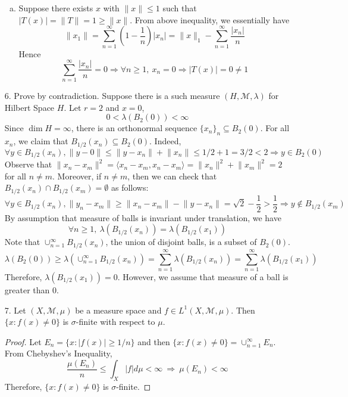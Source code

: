 \begin{itemize}
\begin{enumerate}[(a)]
			\item Suppose there exists $x$ with $\lVert x\rVert \le 1$ such that $|T(x)| = \lVert T\rVert = 1 \ge \lVert x\rVert$. From above inequality, we essentially have
			$$
			\lVert x_1\rVert = \sum_{n=1}^\infty \left(1-\frac{1}{n}\right) \left\lvert  x_n  \right\rvert = \lVert x\rVert_1 - \sum_{n=1}^\infty \frac{|x_n|}{n}
			$$
			Hence
			$$
			\sum_{n=1}^\infty \frac{|x_n|}{n} = 0 \Rightarrow  \forall n\ge 1,~ x_n=0 \Rightarrow |T(x)| = 0 \neq 1
			$$
		\end{enumerate}
		
		\item[6.] Prove by contradiction. Suppose there is a such measure $(H, \mathcal{M}, \lambda)$ for Hilbert Space $H$. Let $r=2$ and $x=0$, 
		$$
		0<\lambda\left(B_2(0)\right)<\infty
		$$
		Since $\dim H =\infty$, there is an orthonormal sequence $\{x_n\}_n\subseteq B_2(0)$. For all $x_n$, we claim that $B_{1/2}(x_n)\subseteq B_2(0)$. Indeed,
		$$
		\forall y\in B_{1/2}(x_n), \lVert y-0\rVert \le  \lVert y-x_n\rVert + \lVert x_n\rVert \le 1/2 + 1 = 3/2 < 2 \Rightarrow y\in B_2(0)
		$$
		Observe that $\lVert x_n - x_m \rVert ^2 = \langle x_n-x_m, x_n-x_m\rangle = \lVert x_n\rVert^2 + \lVert x_m\rVert^2 = 2$ for all $n\neq m$. Moreover, if $n\neq m$, then we can check that $B_{1/2}(x_n) \cap B_{1/2}(x_m) = \emptyset$ as follows:
		$$
		\forall y\in B_{1/2}(x_n), \lVert y_n - x_m \rVert \ge \lVert x_n -x_m \rVert - \lVert y-x_n\rVert = \sqrt{2} - \frac{1}{2}  > \frac{1}{2} \Rightarrow y\not \in B_{1/2}(x_m) 
		$$
		By assumption that measure of balls is invariant under translation, we have 
		$$\forall n\ge 1, ~\lambda(B_{1/2}(x_n)) = \lambda(B_{1/2}(x_1))$$
		Note that $\cup_{n=1}^\infty B_{1/2}(x_n)$, the union of disjoint balls, is a subset of $B_2(0)$. 
		$$
		\lambda(B_2(0)) \ge \lambda\left( \cup_{n=1}^\infty B_{1/2}(x_n)\right) =\sum_{n=1}^\infty \lambda(B_{1/2}(x_n)) = \sum_{n=1}^\infty \lambda(B_{1/2}(x_1))
		$$
		Therefore, $\lambda(B_{1/2}(x_1)) = 0$. However, we assume that measure of a ball is greater than 0.
		
		\item[7.] Let $(X,\mathcal{M}, \mu)$ be a measure space and $f \in L^1(X,\mathcal{M}, \mu)$. Then $\{x : f(x) \neq 0\}$ is
		$\sigma$-finite with respect to $\mu$.

		\begin{proof}
			Let $E_n = \{x: |f(x)| \ge 1/n \}$ and then $\{x: f(x)\neq 0\} = \cup_{n=1}^\infty  E_n$. From Chebyshev's Inequality, 
			$$
			\frac{ \mu(E_n)}{n} \le  \int_X |f| d\mu < \infty ~\Rightarrow~ \mu(E_n) < \infty
			$$	
			Therefore, $\{x : f(x) \neq 0\}$ is $\sigma$-finite.
		\end{proof}
	

\end{itemize}
